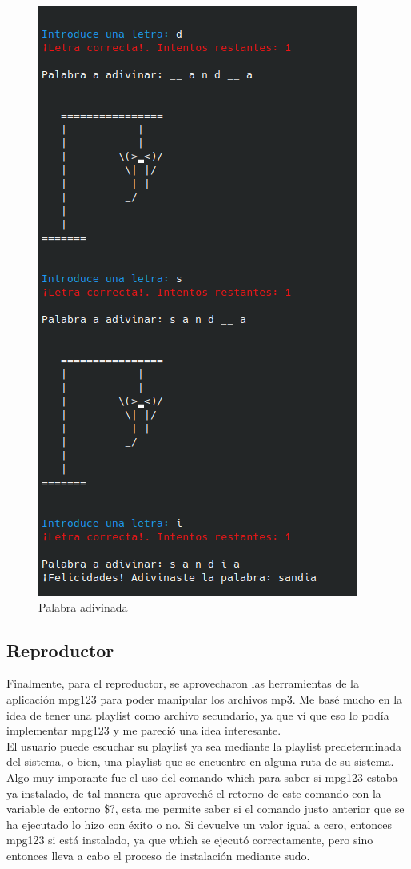 \documentclass[letter,11pt]{article}
\begin{document}
\begin{figure} [H]
    \centering 
    \caption{Palabra adivinada}
    \includegraphics[scale=.7]{ahorcado2.png} 
\end{figure}

\subsection{Reproductor}
Finalmente, para el reproductor, se aprovecharon las herramientas de la aplicación mpg123 para poder manipular los archivos mp3. Me basé mucho en la idea de tener una playlist como archivo secundario, ya que ví que eso lo podía implementar mpg123 y me pareció una idea interesante.\\
El usuario puede escuchar su playlist ya sea mediante la playlist predeterminada del sistema, o bien, una playlist que se encuentre en alguna ruta de su sistema.\\
Algo muy imporante fue el uso del comando which para saber si mpg123 estaba ya instalado, de tal manera que aproveché el retorno de este comando con la variable de entorno \$?, esta me permite saber si el comando justo anterior que se ha ejecutado lo hizo con éxito o no. Si devuelve un valor igual a cero, entonces mpg123 si está instalado, ya que which se ejecutó correctamente, pero sino entonces lleva a cabo el proceso de instalación mediante sudo.\\
\end{document}
